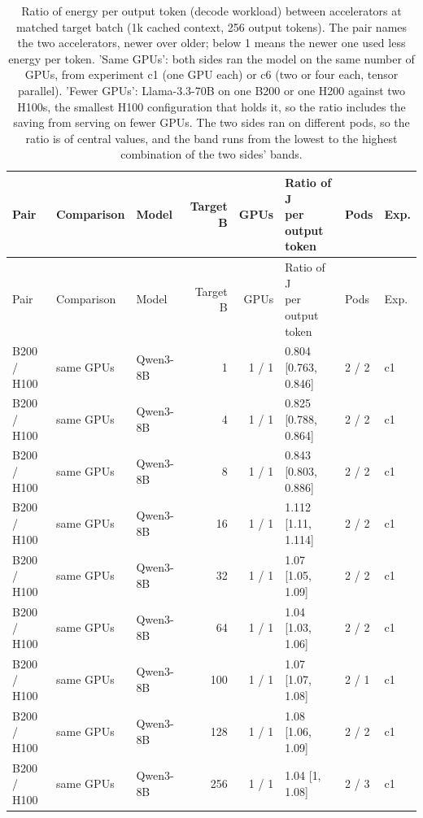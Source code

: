 \begingroup
\footnotesize
\setlength{\tabcolsep}{4pt}
\begin{longtable}{lllrrlll}
\caption{Ratio of energy per output token (decode workload) between accelerators at matched target batch (1k cached context, 256 output tokens). The pair names the two accelerators, newer over older; below 1 means the newer one used less energy per token. 'Same GPUs': both sides ran the model on the same number of GPUs, from experiment c1 (one GPU each) or c6 (two or four each, tensor parallel). 'Fewer GPUs': Llama-3.3-70B on one B200 or one H200 against two H100s, the smallest H100 configuration that holds it, so the ratio includes the saving from serving on fewer GPUs. The two sides ran on different pods, so the ratio is of central values, and the band runs from the lowest to the highest combination of the two sides' bands.}\label{tab:b200_h100}\\
\toprule
Pair & Comparison & Model & Target B & GPUs & \makecell[l]{Ratio of J\\per output\\token} & Pods & Exp. \\
\midrule
\endfirsthead
\toprule
Pair & Comparison & Model & Target B & GPUs & \makecell[l]{Ratio of J\\per output\\token} & Pods & Exp. \\
\midrule
\endhead
\bottomrule
\endfoot
B200 / H100 & same GPUs & Qwen3-8B & 1 & 1 / 1 & 0.804 {[}0.763, 0.846{]} & 2 / 2 & c1 \\
B200 / H100 & same GPUs & Qwen3-8B & 4 & 1 / 1 & 0.825 {[}0.788, 0.864{]} & 2 / 2 & c1 \\
B200 / H100 & same GPUs & Qwen3-8B & 8 & 1 / 1 & 0.843 {[}0.803, 0.886{]} & 2 / 2 & c1 \\
B200 / H100 & same GPUs & Qwen3-8B & 16 & 1 / 1 & 1.112 {[}1.11, 1.114{]} & 2 / 2 & c1 \\
B200 / H100 & same GPUs & Qwen3-8B & 32 & 1 / 1 & 1.07 {[}1.05, 1.09{]} & 2 / 2 & c1 \\
B200 / H100 & same GPUs & Qwen3-8B & 64 & 1 / 1 & 1.04 {[}1.03, 1.06{]} & 2 / 2 & c1 \\
B200 / H100 & same GPUs & Qwen3-8B & 100 & 1 / 1 & 1.07 {[}1.07, 1.08{]} & 2 / 1 & c1 \\
B200 / H100 & same GPUs & Qwen3-8B & 128 & 1 / 1 & 1.08 {[}1.06, 1.09{]} & 2 / 2 & c1 \\
B200 / H100 & same GPUs & Qwen3-8B & 256 & 1 / 1 & 1.04 {[}1, 1.08{]} & 2 / 3 & c1 \\

\end{longtable}
